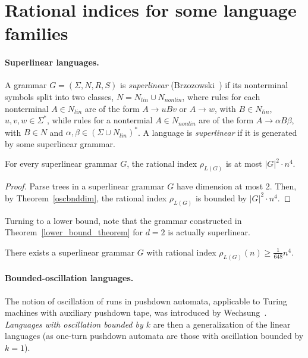 \documentclass[runningheads]{llncs}
\begin{document}
\section{Rational indices for some language families}\label{section_implications}

\paragraph{Superlinear languages.}
A grammar $G = (\Sigma, N, R, S)$ is \textit{superlinear} (Brzozowski~\cite{superlinear})
if its nonterminal symbols split into two classes, $N = N_{lin} \cup N_{nonlin}$,
where rules for each nonterminal $A \in N_{lin}$
are of the form $A \to uBv$ or $A \to w$, with $B \in N_{lin}$, $u,v,w \in \Sigma^*$,
while rules for a nontermial $A \in N_{nonlin}$
are of the form $A \to \alpha B \beta$, with $B \in N$ and $\alpha,\beta \in (\Sigma \cup N_{lin})^*$.
A language is \textit{superlinear} if it is generated by some superlinear grammar. 

\begin{corollary}
For every superlinear grammar $G$,
the rational index $\rho_{L(G)}$ is at most $|G|^2 \cdot n^4$.
\end{corollary}
\begin{proof}
Parse trees in a superlinear grammar $G$ have dimension at most 2.
Then, by Theorem~\ref{oscbnddim},
the rational index $\rho_{L(G)}$ is bounded by $|G|^2 \cdot n^4$.
\end{proof}

Turning to a lower bound, note that the grammar
constructed in Theorem~\ref{lower_bound_theorem} for $d=2$
is actually superlinear.

\begin{corollary}
There exists a superlinear grammar $G$
with rational index $\rho_{L(G)}(n) \geqslant \frac{1}{648} n^4$.
\end{corollary}






\paragraph{Bounded-oscillation languages.}
The notion of oscillation of runs in pushdown automata,
applicable to Turing machines with auxiliary pushdown tape,
was introduced by Wechsung~\cite{Wechsung}.
\emph{Languages with oscillation bounded by $k$}
are then a generalization of the linear languages
(as one-turn pushdown automata are those with oscillation bounded by $k=1$).
\end{document}
